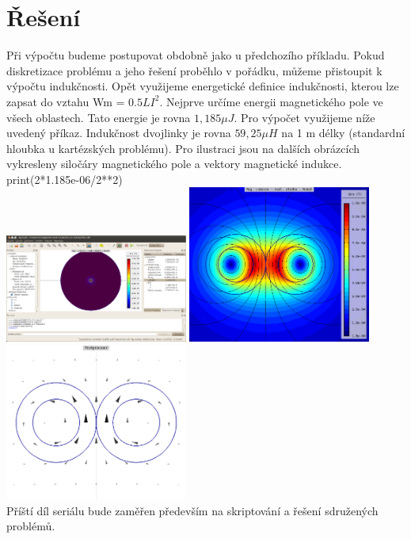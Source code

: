 \documentclass[a4paper, oneside]{article}
\begin{document}
\section{Řešení}
Při výpočtu budeme postupovat obdobně jako u předchozího příkladu. Pokud diskretizace problému a jeho řešení proběhlo v pořádku, můžeme přistoupit k výpočtu indukčnosti. Opět využijeme energetické definice indukčnosti, kterou lze zapsat do vztahu Wm = $0.5 LI^2$. Nejprve určíme energii magnetického pole ve všech oblastech. Tato energie je rovna $1,185 \mu J$. Pro výpočet využijeme níže uvedený příkaz. Indukčnost dvojlinky je rovna $59,25 \mu H$ na 1 m délky (standardní hloubka u kartézských problému). Pro ilustraci jsou na dalších obrázcích vykresleny siločáry magnetického pole a vektory magnetické indukce.\\
print(2*1.185e-06/2**2)\\
\includegraphics[width=6cm]{Vypocet_indukcnosti.eps}
\includegraphics[width=6cm]{Silocary.eps}\\
\includegraphics[width=6cm]{Vektory.eps}\\
Příští díl seriálu bude zaměřen především na skriptování a řešení sdružených problémů.\\
\end{document}
